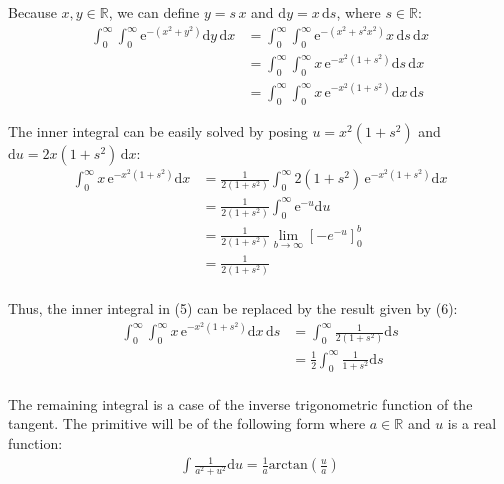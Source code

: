 \documentclass[11pt]{article}
\begin{document}
Because $x,y\in\mathbb{R}$, we can define $y=s\,x$ and $\mathrm dy = x\,\mathrm ds$, where $s\in\mathbb{R}$:
\begin{equation}
\begin{split}
\int_{0}^{\infty}\int_{0}^{\infty}
\mathrm e^{-(x^2+y^2)}\mathrm dy\,\mathrm dx
&= \int_{0}^{\infty}\int_{0}^{\infty}\mathrm e^{-(x^2+s^2x^2)}x\,\mathrm ds\,\mathrm dx\\
&= \int_{0}^{\infty}\int_{0}^{\infty}x\,\mathrm e^{-x^2(1+s^2)}\mathrm ds\,\mathrm dx\\
&= \int_{0}^{\infty}\int_{0}^{\infty}x\,\mathrm e^{-x^2(1+s^2)}\mathrm dx\,\mathrm ds
\end{split}
\end{equation}

The inner integral can be easily solved by posing $u=x^2(1+s^2)$ and $\mathrm du=2x(1+s^2)\,\mathrm dx$:
\begin{equation}
\begin{split}
\int_{0}^{\infty}x\,\mathrm e^{-x^2(1+s^2)}\mathrm dx
&= \frac{1}{2(1+s^2)}\int_{0}^{\infty}2(1+s^2)\,\mathrm e^{-x^2(1+s^2)}\mathrm dx\\
&= \frac{1}{2(1+s^2)}\int_{0}^{\infty}\mathrm e^{-u}\mathrm du\\
&= \frac{1}{2(1+s^2)}\lim_{b\rightarrow \infty}\left [-e^{-u} \right ]_{0}^{b}\\
&= \frac{1}{2(1+s^2)}\\
\end{split}
\end{equation}

Thus, the inner integral in (5) can be replaced by the result given by (6):
\begin{equation}
\begin{split}
\int_{0}^{\infty}\int_{0}^{\infty}x\,\mathrm e^{-x^2(1+s^2)}\mathrm dx\,\mathrm ds
&= \int_{0}^{\infty}\frac{1}{2(1+s^2)}\mathrm ds\\
&= \frac{1}{2}\int_{0}^{\infty}\frac{1}{1+s^2}\mathrm ds\\
\end{split}
\end{equation}

The remaining integral is a case of the inverse trigonometric function of the tangent. The primitive will be of the following form where $a\in \mathbb{R}$ and $u$ is a real function:
\begin{equation}
\begin{split}
\int\frac{1}{a^2+u^2}\mathrm du=\frac{1}{a}\text{arctan}\left ( \frac{u}{a}\right )
\end{split}
\end{equation}
\end{document}
